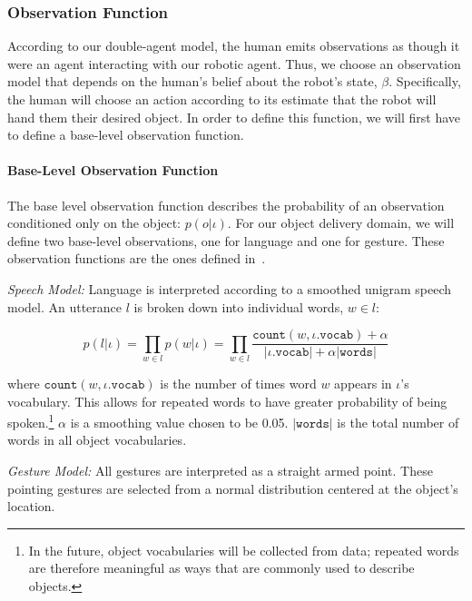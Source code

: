 \documentclass[conference]{IEEEtran}
\begin{document}
\subsubsection{Observation Function} \label{sssec:of}

According to our double-agent model, the human emits observations as though it were an agent interacting with our robotic agent. Thus, we choose an observation model that depends on the human's belief about the robot's state, $\beta$. Specifically, the human will choose an action according to its estimate that the robot will hand them their desired object. In order to define this function, we will first have to define a base-level observation function. 

\paragraph{Base-Level Observation Function} \label{baseobs}

The base level observation function describes the probability of an observation conditioned only on the object: $p(o|\iota)$. For our object delivery domain, we will define two base-level observations, one for language and one for gesture. These observation functions are the ones defined in~\citet{whitney16}. 

\vspace{0.5em}

\noindent\textit{Speech Model:} Language is interpreted according to a smoothed unigram speech model. An utterance $l$ is broken down into individual words, $w \in l$: 

\begin{equation*}
	p(l|\iota) = \prod_{w \in l} p(w|\iota) = \prod_{w\in l} \frac{\texttt{count}(w, \iota.\texttt{vocab}) + \alpha}{|\iota.\texttt{vocab}| + \alpha |\texttt{words}|}
\end{equation*}

where $\texttt{count}(w, \iota.\texttt{vocab})$ is the number of times word $w$ appears in $\iota$'s vocabulary. This allows for repeated words to have greater probability of being spoken.\footnote{In the future, object vocabularies will be collected from data; repeated words are therefore meaningful as ways that are commonly used to describe objects.}  $\alpha$ is a smoothing value chosen to be 0.05.  $|\texttt{words}|$ is the total number of words in all object vocabularies. 
\vspace{0.5em}

\noindent\textit{Gesture Model:} All gestures are interpreted as a straight armed point. These pointing gestures are selected from a normal distribution centered at the object's location. 
\end{document}
